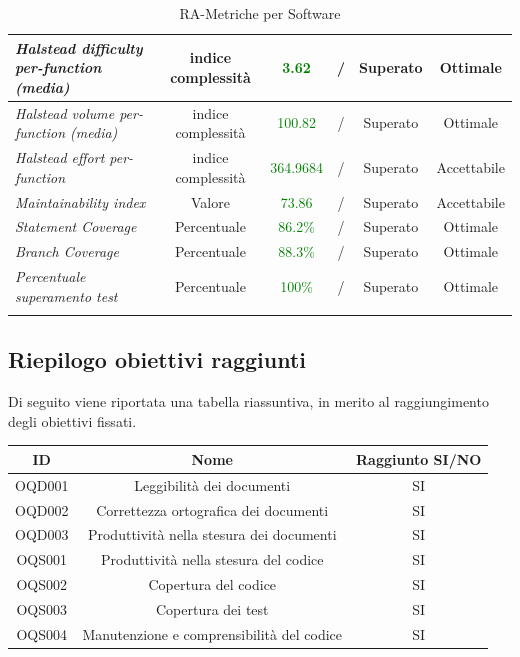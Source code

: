 {\begin{longtable}{|>{\centering}m{2cm}|c|c|c|c|c|}
  	
  	
  	\emph{Halstead difficulty per-function (media) } & {indice complessità} & \textcolor{Green}{3.62} & / & Superato & Ottimale\\ \hline
  	\emph{Halstead volume per-function (media)} & {indice complessità} & \textcolor{Green}{100.82} & / & Superato & Ottimale\\ \hline
  	\emph{Halstead effort per-function} & {indice complessità} & \textcolor{Green}{364.9684} & / & Superato & Accettabile\\ \hline
  	
  	
  	\emph{Maintainability index} & {Valore} & \textcolor{Green}{73.86} & / & Superato  & Accettabile \\ \hline
  	
  	\emph{Statement Coverage} & {Percentuale} & \textcolor{Green}{86.2\%} & / & Superato & Ottimale\\ \hline
  	
  	
  	\emph{Branch Coverage} & {Percentuale} & \textcolor{Green}{88.3\%} & / & Superato & Ottimale\\ \hline
  	
  	
  	\emph{Percentuale superamento test} & {Percentuale} & \textcolor{Green}{100\%} & / & Superato & Ottimale\\ \hline
  	
  	
  	\caption{RA-Metriche per Software}\\
  \end{longtable}

\subsection{Riepilogo obiettivi raggiunti}

Di seguito viene riportata una tabella riassuntiva, in merito al raggiungimento degli obiettivi fissati.

\begin{center}
	\centering
	\begin{tabular}{|c|c|c|}
		\hline
		\textbf{ID} & \textbf{Nome} & \textbf{Raggiunto SI/NO} \\
		\hline OQD001 & Leggibilità dei documenti & SI  \\
		\hline OQD002 & Correttezza ortografica dei documenti & SI \\
		\hline OQD003 & Produttività nella stesura dei documenti & SI \\
		\hline OQS001 & Produttività nella stesura del codice & SI \\
		\hline OQS002 & Copertura del codice & SI  \\
		\hline OQS003 & Copertura dei test & SI \\
		\hline OQS004 & Manutenzione e comprensibilità del codice & SI  \\
	

\end{tabular}
\end{center}}
